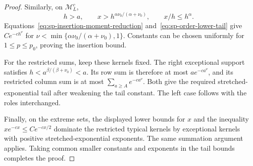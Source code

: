 \documentclass[11pt]{article}
\theoremstyle{remark}
\theoremstyle{plain}
\begin{document}
\begin{proof}
Similarly, on $\mathcal M_L^c$,
\[
 h>a,\qquad x>h^{\alpha\nu_0/(\alpha+\nu_0)},\qquad x/h\le h^\alpha.
\]
Equations~\eqref{eq:sp-insertion-moment-reduction}
and~\eqref{eq:sp-order-lower-tail} give $Ce^{-ch^\nu}$ for
$\nu<\min\{\alpha\nu_0/(\alpha+\nu_0),1\}$.  Constants can be chosen
uniformly for $1\le p\le p_0$, proving the insertion bound.

For the restricted sums, keep these kernels fixed.  The right exceptional
support satisfies $h<a^{\beta/(\beta+\nu_0)}<a$.  Its row sum is
therefore at most $ae^{-ca^\nu}$, and its restricted column sum is at
most $\sum_{a\ge A}e^{-ca^\nu}$.  Both give the required
stretched-exponential tail after weakening the tail constant.  The left
case follows with the roles interchanged.

Finally, on the extreme sets, the displayed lower bounds for $x$ and
the inequality $xe^{-cx}\le Ce^{-cx/2}$ dominate the restricted typical
kernels by exceptional kernels with positive stretched-exponential
exponents.  The same summation argument applies.  Taking common smaller
constants and exponents in the tail bounds completes the proof.
\end{proof}
\end{document}
